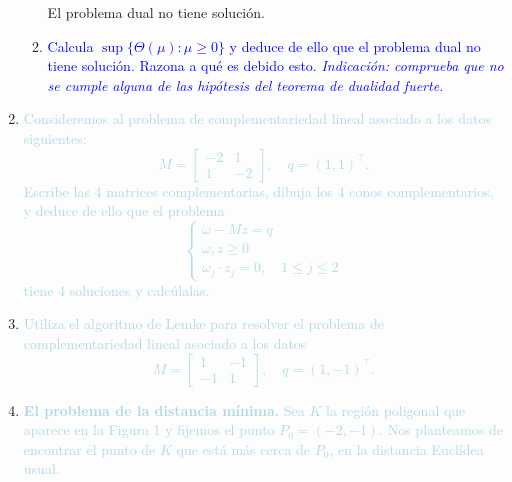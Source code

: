 \documentclass[a4paper]{article}
\newcommand{\lb}[1]{\textcolor{lightblue}{#1}}
\newcommand{\db}[1]{\textcolor{blue}{#1}}
\begin{document}
\begin{enumerate}[label=\color{red}\arabic*.]
\begin{enumerate}[label=\color{red}\alph*)]
    	El problema dual no tiene solución.
    	\item \db{Calcula $\sup\{\Theta(\mu):\mu\ge0\}$ y deduce de ello que el problema dual no tiene solución. Razona a qué es debido esto. \textit{Indicación: comprueba que no se cumple alguna de las hipótesis del teorema de dualidad fuerte.}}
    \end{enumerate}
    \item \lb{Consideremos al problema de complementariedad lineal asociado a los datos siguientes: \[ M=\begin{bmatrix}
    -2 & 1 \\
    1 & -2
    \end{bmatrix},\quad q=(1,1)^\intercal. \] Escribe las 4 matrices complementarias, dibuja los 4 conos complementarios, y deduce de ello que el problema \[ \begin{cases}
    \omega-Mz=q\\
    \omega,z\ge0\\
    \omega_j\cdot z_j=0,\quad 1\le j\le 2
    \end{cases} \]tiene 4 soluciones y calcúlalas.}
    
    \item \lb{Utiliza el algoritmo de Lemke para resolver el problema de complementariedad lineal asociado a los datos \[ M=\begin{bmatrix}
    1 & -1 \\
    -1 & 1
    \end{bmatrix},\quad q=(1,-1)^\intercal.\]}
    
    \item \lb{\textbf{El problema de la distancia mínima.} Sea $K$ la región poligonal que aparece en la Figura 1 y fijemos el punto $P_0=(-2,-1)$. Nos planteamos de encontrar el punto de $K$ que está más cerca de $P_0$, en la distancia Euclídea usual.}
    
    \begin{center}
\end{center}
\end{enumerate}
\end{document}

